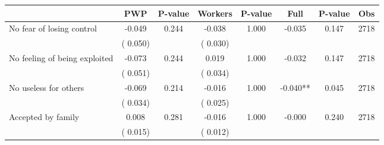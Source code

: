 
\begin{tabular}{l*{7}{c}}\hline&\multicolumn{1}{c}{PWP}&\multicolumn{1}{c}{P-value}&\multicolumn{1}{c}{Workers}&\multicolumn{1}{c}{P-value}&\multicolumn{1}{c}{Full}&\multicolumn{1}{c}{P-value}&\multicolumn{1}{c}{Obs} \\ \hline

 No fear of losing control       &             -0.049       &        0.244  &             -0.038       &        1.000  &             -0.035       &              0.147 &  2718 \\ 
                       &       (       0.050)             &                               &       (       0.030)                     &                               &                                               &                                &                      \\ 

 No feeling of being exploited       &             -0.073       &        0.244  &              0.019       &        1.000  &             -0.032       &              0.147 &  2718 \\ 
                       &       (       0.051)             &                               &       (       0.034)                     &                               &                                               &                                &                      \\ 

 No useless for others       &             -0.069       &        0.214  &             -0.016       &        1.000  &             -0.040**       &              0.045 &  2718 \\ 
                       &       (       0.034)             &                               &       (       0.025)                     &                               &                                               &                                &                      \\ 

 Accepted by family       &              0.008       &        0.281  &             -0.016       &        1.000  &             -0.000       &              0.240 &  2718 \\ 
                       &       (       0.015)             &                               &       (       0.012)                     &                               &                                               &                                &                      \\ 


\end{tabular}
